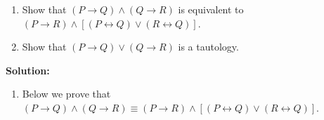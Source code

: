 \begin{enumerate}[label=(\alph*)]
    \item Show that $(P \rightarrow Q) \wedge (Q \rightarrow R)$ is equivalent to $(P \rightarrow R) \wedge [(P \leftrightarrow Q) \vee (R \leftrightarrow Q)]$.
    \item Show that $(P \rightarrow Q) \vee (Q \rightarrow R)$ is a tautology.
\end{enumerate}
\textbf{Solution:}
\begin{enumerate}[label=(\alph*)]
    \item Below we prove that $(P \rightarrow Q) \wedge (Q \rightarrow R) \equiv (P \rightarrow R) \wedge [(P \leftrightarrow Q) \vee (R \leftrightarrow Q)]$.\\

    \
    

\end{enumerate}
